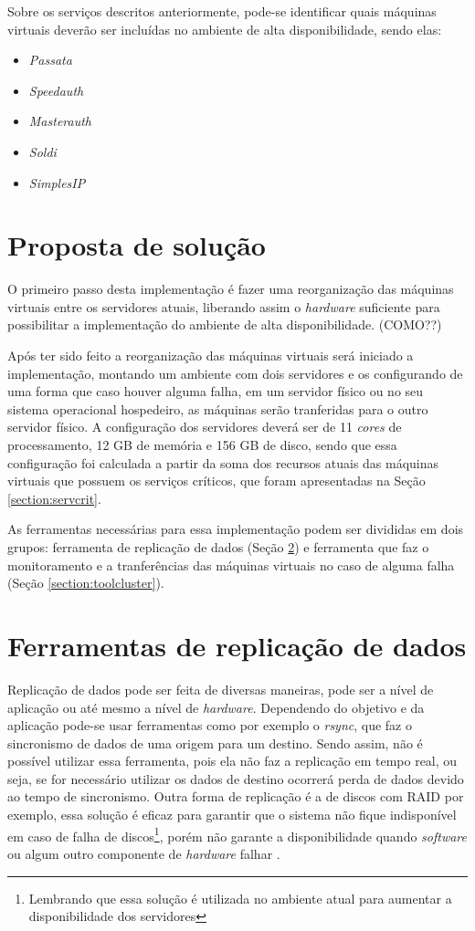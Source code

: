 Sobre os serviços descritos anteriormente, pode-se identificar quais máquinas virtuais deverão ser incluídas no 
ambiente de alta disponibilidade, sendo elas:
\begin{itemize}
 \item \textit{Passata}
 \item \textit{Speedauth}
 \item \textit{Masterauth}
 \item \textit{Soldi}
 \item \textit{SimplesIP}
\end{itemize}

\section{Proposta de solução}

O primeiro passo desta implementação é fazer uma reorganização das máquinas virtuais entre os servidores atuais, liberando assim o 
\textit{hardware} suficiente para possibilitar a implementação do ambiente de alta disponibilidade. (COMO??)

Após ter sido feito a reorganização das máquinas virtuais será iniciado a implementação, montando um ambiente com dois servidores e os 
configurando de uma forma que caso houver alguma falha, em um servidor físico ou no seu sistema operacional hospedeiro, as máquinas serão 
tranferidas para o outro servidor físico. 
A configuração dos servidores deverá ser de 11 \textit{cores} de processamento, 12 GB de memória e 156 GB de disco, sendo que essa configuração 
foi calculada a partir da soma dos recursos atuais das máquinas virtuais que possuem os serviços críticos, que foram apresentadas na Seção 
\ref{section:servcrit}.

As ferramentas necessárias para essa implementação podem ser divididas em dois grupos: ferramenta de replicação de dados 
(Seção \ref{section:toolrepl}) e ferramenta que faz o monitoramento e a tranferências das máquinas virtuais no caso de alguma falha 
(Seção \ref{section:toolcluster}).

\section{Ferramentas de replicação de dados}
\label{section:toolrepl}

Replicação de dados pode ser feita de diversas maneiras, pode ser a nível de aplicação ou até mesmo a nível de \textit{hardware}.
Dependendo do objetivo e da aplicação pode-se usar ferramentas como por exemplo o \textit{rsync}, que faz o sincronismo de dados de uma origem
para um destino. Sendo assim, não é possível utilizar essa ferramenta, pois ela não faz a replicação em tempo real, ou seja, se for necessário
utilizar os dados de destino ocorrerá perda de dados devido ao tempo de sincronismo. Outra forma de replicação é a de discos com \ac{RAID} 
por exemplo, essa solução é eficaz para garantir que o sistema não fique indisponível em caso de falha de discos\footnote{Lembrando que essa 
solução é utilizada no ambiente atual para aumentar a disponibilidade dos servidores}, porém não garante a disponibilidade quando \textit{software}
ou algum outro componente de \textit{hardware} falhar \cite{zaminhani2008}.

